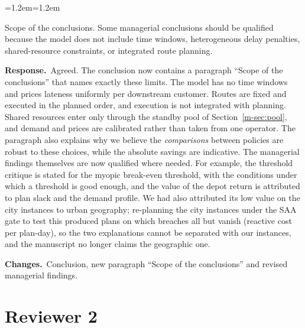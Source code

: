 \documentclass[11pt]{article}
\newenvironment{comment}{\par\medskip\noindent\color{rev}\itshape
  \begin{list}{}{\leftmargin=1.2em\rightmargin=1.2em}\item[]}%
  {\end{list}\par}
\newcommand{\resp}{\par\noindent\textbf{Response.}\ }
\newcommand{\chg}{\par\noindent\textbf{Changes.}\ }
\newcommand{\sref}[1]{Section~\ref{m-#1}}
\begin{document}
\begin{comment}
Scope of the conclusions. Some managerial conclusions should be
qualified because the model does not include time windows,
heterogeneous delay penalties, shared-resource constraints, or
integrated route planning.
\end{comment}
\resp Agreed. The conclusion now contains a paragraph ``Scope of the
conclusions'' that names exactly these limits. The model has no time
windows and prices lateness uniformly per downstream customer. Routes
are fixed and executed in the planned order, and execution is not
integrated with planning. Shared resources enter only through the
standby pool of \sref{sec:pool}, and demand and prices are calibrated
rather than taken from one operator. The paragraph also explains why we
believe the \emph{comparisons} between policies are robust to these
choices, while the absolute savings are indicative. The managerial
findings themselves are now qualified where needed. For example, the
threshold critique is stated for the myopic break-even threshold, with
the conditions under which a threshold is good enough, and the value of
the depot return is attributed to plan slack and the demand profile.
We had also attributed its low value on the city instances to urban
geography; re-planning the city instances under the \textsc{SAA} gate
to test this produced plans on which breaches all but vanish (reactive
cost \citySaaReact{} per plan-day), so the two explanations cannot be
separated with our instances, and the manuscript no longer claims the
geographic one.
\chg Conclusion, new paragraph ``Scope of the conclusions'' and revised
managerial findings.

\section*{Reviewer 2}
\end{document}

